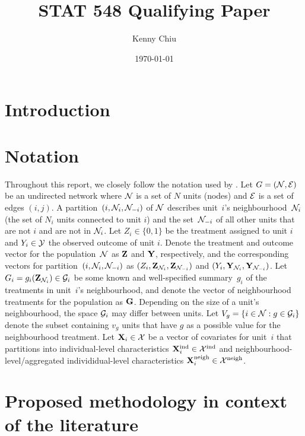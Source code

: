 \documentclass[10pt]{article}
\title{\todo\\\vspace{0.5em}\large{STAT 548 Qualifying Paper}}
\author{Kenny Chiu}
\date{\today}
\begin{document}
\maketitle

\vspace{2em}

\begin{abstract}
\todo
\end{abstract}

\vspace{2em}


\section{Introduction}


\section{Notation}

Throughout this report, we closely follow the notation used by \textcite{Forastiere:2021}. Let $G=(\mathcal{N},\mathcal{E})$ be an undirected network where $\mathcal{N}$ is a set of $N$ units (nodes) and $\mathcal{E}$ is a set of edges $(i,j)$. A partition~$(i,\mathcal{N}_i,\mathcal{N}_{-i})$ of $\mathcal{N}$ describes unit~$i$'s neighbourhood~$\mathcal{N}_i$ (the set of $N_i$ units connected to unit $i$) and the set~$\mathcal{N}_{-i}$ of all other units that are not $i$ and are not in $\mathcal{N}_i$. Let $Z_i\in\{0,1\}$ be the treatment assigned to unit $i$ and $Y_i\in\mathcal{Y}$ the observed outcome of unit $i$. Denote the treatment and outcome vector for the population~$\mathcal{N}$ as $\mathbf{Z}$ and $\mathbf{Y}$, respectively, and the corresponding vectors for partition~$(i,\mathcal{N}_i,\mathcal{N}_{-i})$ as $(Z_i,\mathbf{Z}_{\mathcal{N}_i},\mathbf{Z}_{\mathcal{N}_{-i}})$ and $(Y_i,\mathbf{Y}_{\mathcal{N}_i},\mathbf{Y}_{\mathcal{N}_{-i}})$. Let $G_i=g_i(\mathbf{Z}_{\mathcal{N}_i})\in\mathcal{G}_i$ be some known and well-specified summary~$g_i$ of the treatments in unit~$i$'s neighbourhood, and denote the vector of neighbourhood treatments for the population as $\mathbf{G}$. Depending on the size of a unit's neighbourhood, the space $\mathcal{G}_i$ may differ between units. Let $V_g=\{i\in\mathcal{N}:g\in\mathcal{G}_i\}$ denote the subset containing $v_g$ units that have $g$ as a possible value for the neighbourhood treatment. Let $\mathbf{X}_i\in\mathcal{X}$ be a vector of covariates for unit~$i$ that partitions into individual-level characteristics $\mathbf{X}^{\text{ind}}_i\in\mathcal{X}^\text{ind}$ and neighbourhood-level/aggregated individidual-level characteristics $\mathbf{X}^{\text{neigh}}_i\in\mathcal{X}^\text{neigh}$.


\section{Proposed methodology in context of the literature}
\end{document}
